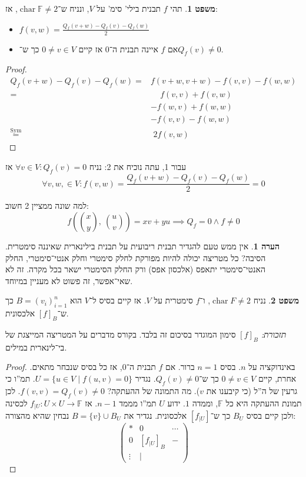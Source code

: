 \documentclass[a4paper]{article}
\DeclareMathOperator{\chr}     {char}
\DeclareMathOperator{\sym}     {Sym}
\newcommand\F         {\mathbb{F}}
\newcommand\co        {\colon}
\newcommand\pms[1]    {\begin{pmatrix}
		#1
\end{pmatrix}}
\theoremstyle{definition}
\newtheorem{Theorem}{משפט}
\newtheorem{Remark}{הערה}
\newcommand\theo  [1] {\begin{Theorem}#1\end{Theorem}}
\newcommand\rmark [1] {\begin{Remark}#1\end{Remark}}
\begin{document}
	\theo{תהי $f$ תבנית בילי' סימ' על $V$, ונניח ש־$\chr \F \neq 2$, אז: 
		\begin{itemize}
			\item \hfil $\displaystyle f(v, w) = \frac{Q_f(v + w) - Q_f(v) - Q_f(w)}{2}$
			\item אם $f$ איינה תבנית ה־$0$ אז קיים $0 \neq v \in V$ כך ש־$Q_f(v) \neq 0$. 
	\end{itemize}}
	\begin{proof}
		\begin{align*}
			Q_f(v + w) - Q_f(v) - Q_f(w) = &f(v + w, v + w) - f(v, v) - f(w, w) \\
			= &\quad\, f(v, v) + f(v, w) \\
			&-f(w, v) + f(w, w) \\
			&-f(v, v) - f(w, w) \\
			\overset{\sym}{=} \!\!&\,\, 2f(v, w)
		\end{align*}
	\end{proof}
	עבור 1, עתה נוכיח את 2: נניח $\forall v \in V \co Q_f(v) = 0$ אז
	\[ \forall v, w, \in V \co f(v, w) = \frac{Q_f(v + w) - Q_f(v) - Q_f(w)}{2} = 0  \]
	
	למה שונה ממציין 2 חשוב: 
	\[ \textstyle f(\binom{x}{y}, \ \binom{u}{v}) = xv + yu \implies Q_f = 0 \land f \neq 0 \]
	
	\rmark{אין ממש טעם להגדיר תבנית ריבועית על תבנית בילינארית שאיננה סימטרית. הסיבה? כל מטריצה יכולה להיות מפורקת לחלק סימטרי וחלק אנטי־סימטרי, החלק האנטי־סימטרי יתאפס (אלכסון אפס) ורק החלק הסימטרי ישאר בכל מקרה. זה לא שאי־אפשר, זה פשוט לא מעניין במיוחד. }
	
	\theo{נניח $\chr F \neq 2$, ו־$f$ סימטרית על $V$. אז קיים בסיס ל־$V$ הוא $B = (v_i)_{i = 1}^{n}$ כך ש־$[f]_B$ אלכסונית. }
	
	\textit{תזכורת: }$[f]_B$ סימון המוגדר בסיכום זה בלבד. בקורס מדברים על המטריצה המייצגת של בי־לינארית במילים. 
	
	\begin{proof}
		באינדוקציה על $n$. בסיס $n = 1$ ברור. אם $f$ תבנית ה־$0$, אז כל בסיס שנבחר מתאים. אחרת, קיים $0 \neq v \in V$ כך ש־$Q_f(v) \neq 0$. נגדיר $U = \{u \in V \mid f(u, v) = 0\}$. תמ''ו כי גרעין של ה''ל (כי קיבענו את $v$). מה התמונה של ההעתקה? $f(v, v) = Q_f(v) \neq 0$. לכן תמונת ההעתקה היא כל $\F$, וממדה $1$. ידוע $U$ תמ''ו מממד $n - 1$. אז $f_{|U} \co U\times U \to \F$ לכסינה ולכן קיים בסיס $B_U$ כך ש־$[f_{|U}]$ אלכסונית. נגדיר את $B = \{v\} \cup B_U$ נבחין שהיא מהצורה: 
		\[ \pms{* & 0& \cdots \\ 0 & [f_{|U}]_B& - \\ \vdots & \vert} \]
	\end{proof}
	
\end{document}
